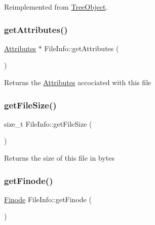 Reimplemented from \mbox{\hyperlink{classTreeObject_a453b5df2a9ef7c6faad259900d574ee2}{Tree\+Object}}.

\mbox{\label{classFileInfo_abc9f651fdf3daf17e5526628b9edc272}} 
\subsubsection{\texorpdfstring{get\+Attributes()}{getAttributes()}}
{\footnotesize\ttfamily \mbox{\hyperlink{classAttributes}{Attributes}} $\ast$ File\+Info\+::get\+Attributes (\begin{DoxyParamCaption}{ }\end{DoxyParamCaption})}

\begin{DoxyReturn}{Returns}
the \mbox{\hyperlink{classAttributes}{Attributes}} accociated with this file 
\end{DoxyReturn}
\mbox{\label{classFileInfo_a7c33e236c627e7a4557207e9831342eb}} 
\subsubsection{\texorpdfstring{get\+File\+Size()}{getFileSize()}}
{\footnotesize\ttfamily size\+\_\+t File\+Info\+::get\+File\+Size (\begin{DoxyParamCaption}{ }\end{DoxyParamCaption})}

\begin{DoxyReturn}{Returns}
the size of this file in bytes 
\end{DoxyReturn}
\mbox{\label{classFileInfo_a80777be7ba01a63cca90c8d9062c49b3}} 
\subsubsection{\texorpdfstring{get\+Finode()}{getFinode()}}
{\footnotesize\ttfamily \mbox{\hyperlink{structfinode}{Finode}} File\+Info\+::get\+Finode (\begin{DoxyParamCaption}{ }\end{DoxyParamCaption})}

